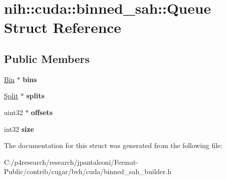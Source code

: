 \hypertarget{structnih_1_1cuda_1_1binned__sah_1_1_queue}{}\section{nih\+:\+:cuda\+:\+:binned\+\_\+sah\+:\+:Queue Struct Reference}
\label{structnih_1_1cuda_1_1binned__sah_1_1_queue}
\subsection*{Public Members}
\begin{DoxyCompactItemize}
\item 
\mbox{\label{structnih_1_1cuda_1_1binned__sah_1_1_queue_aff238d4fb334d54c834940553943ed09}} 
\hyperlink{structnih_1_1cuda_1_1binned__sah_1_1_bin}{Bin} $\ast$ {\bfseries bins}
\item 
\mbox{\label{structnih_1_1cuda_1_1binned__sah_1_1_queue_ad4afdd0276383ba3579f6336ffc7d4a1}} 
\hyperlink{structnih_1_1cuda_1_1binned__sah_1_1_split}{Split} $\ast$ {\bfseries splits}
\item 
\mbox{\label{structnih_1_1cuda_1_1binned__sah_1_1_queue_a1af898af00d47778ec05e38db8af54df}} 
uint32 $\ast$ {\bfseries offsets}
\item 
\mbox{\label{structnih_1_1cuda_1_1binned__sah_1_1_queue_a2eb71c1a3d35300313a8af98235f6110}} 
int32 {\bfseries size}
\end{DoxyCompactItemize}


The documentation for this struct was generated from the following file\+:\begin{DoxyCompactItemize}
\item 
C\+:/p4research/research/jpantaleoni/\+Fermat-\/\+Public/contrib/cugar/bvh/cuda/binned\+\_\+sah\+\_\+builder.\+h\end{DoxyCompactItemize}
